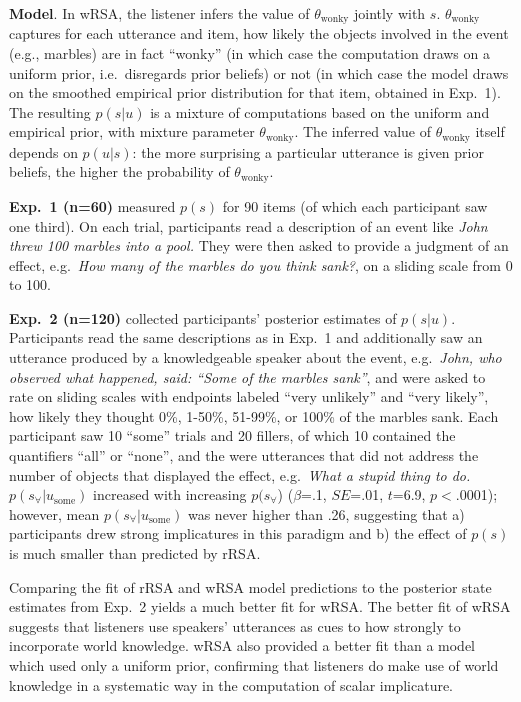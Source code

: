 \documentclass[11pt]{article}
\begin{document}
\textbf{Model}. In wRSA, the listener infers the value of $\theta_{\textrm{wonky}}$ jointly with $s$. $\theta_{\textrm{wonky}}$ captures for each utterance and item, how likely the objects involved in the event (e.g., marbles) are in fact ``wonky'' (in which case the computation draws on a uniform prior, i.e.~disregards prior beliefs) or not (in which case the model draws on the smoothed empirical prior distribution for that item, obtained in Exp.~1). The resulting $p(s|u)$ is a mixture of computations based on the uniform and empirical prior, with mixture parameter $\theta_{\textrm{wonky}}$. The inferred value of $\theta_{\textrm{wonky}}$ itself depends on $p(u|s)$: the more surprising a particular utterance is given prior beliefs, the higher the probability of $\theta_{\textrm{wonky}}$.

\textbf{Exp.~1 (n=60)} measured $p(s)$ for 90 items (of which each participant saw one third). On each trial, participants read a description of an event like \textit{John threw 100 marbles into a pool.} They were then asked to provide a judgment of an effect, e.g.~\textit{How many of the marbles do you think sank?}, on a sliding scale from 0 to 100.

\textbf{Exp.~2 (n=120)} collected participants' posterior estimates of $p(s|u)$. Participants read the same descriptions as in Exp.~1 and additionally saw an utterance produced by a knowledgeable speaker about the event, e.g.~\textit{John, who observed what happened, said: ``Some of the marbles sank''}, and were asked to rate on sliding scales with endpoints labeled ``very unlikely'' and ``very likely'', how likely they thought 0\%, 1-50\%, 51-99\%, or 100\% of the marbles sank. Each participant saw 10 ``some'' trials and 20 fillers, of which 10 contained the quantifiers ``all'' or ``none'', and the were utterances that did not address the number of objects that displayed the effect, e.g.~\textit{What a stupid thing to do.} $p(s_{\forall}|u_{\textrm{some}})$ increased with increasing $p(s_{\forall}$) ($\beta$=.1, $SE$=.01, $t$=6.9, $p$$<$.0001); however, mean $p(s_{\forall}|u_{\textrm{some}})$ was never higher than .26, suggesting that a) participants drew strong implicatures in this paradigm and b) the effect of $p(s)$ is much smaller than predicted by rRSA.

Comparing the fit of rRSA and wRSA model predictions to the posterior state estimates from Exp.~2 yields a much better fit for wRSA. The better fit of wRSA suggests that listeners  use speakers' utterances as cues to how strongly to incorporate world knowledge. wRSA also provided a better fit than a model which used only a uniform prior, confirming that listeners do make use of world knowledge in a systematic way in the computation of scalar implicature.






\end{document}

